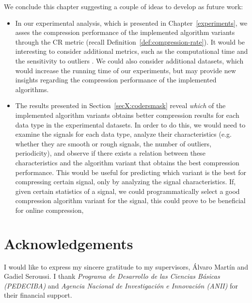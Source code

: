 

We conclude this chapter suggesting a couple of ideas to develop as future work:

\vspace{-5pt}

\begin{itemize} 

\item In our experimental analysis, which is presented in Chapter~\ref{experiments}, we asses the compression performance of the implemented algorithm variants through the CR metric (recall Definition~\ref{def:compression-rate}). It would be interesting to consider additional metrics, such as the computational time and the sensitivity to outliers \cite{AnEva2013}. We could also consider additional datasets, which would increase the running time of our experiments, but may provide new insights regarding the compression performance of the implemented algorithms.

\item The results presented in Section~\ref{secX:codersmask} reveal \textit{which} of the implemented algorithm variants obtains better compression results for each data type in the experimental datasets.  In order to do this, we would need to examine the signals for each data type, analyze their characteristics (e.g. whether they are smooth or rough signals, the number of outliers, periodicity), and observe if there exists a relation between these characteristics and the algorithm variant that obtains the best compression performance. This would be useful for predicting which variant is the best for compressing certain signal, only by analyzing the signal characteristics. If, given certain statistics of a signal, we could programmatically select a good compression algorithm variant for the signal, this could prove to be beneficial for online compression, 
\end{itemize}


\clearpage


\chapter*{Acknowledgements}

I would like to express my sincere gratitude to my supervisors, Álvaro Martín and Gadiel Seroussi. I thank \textit{Programa de Desarrollo de las Ciencias Básicas (PEDECIBA)} and \textit{Agencia Nacional de Investigación e Innovación (ANII)} for their financial support.

\clearpage